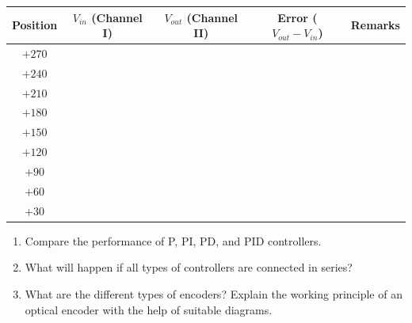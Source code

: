 \begin{procedure}
  \needspace{4cm}
  \begin{boxedtable}
    \label{tab:exp1-closed}
    {\renewcommand{\arraystretch}{1.5}%
      \centering
      \begin{tabular}{|c|c|c|c|c|}
        \hline
        Position & $V_{in}$ (Channel I) & $V_{out}$ (Channel II) & Error ($V_{out}-V_{in}$) & Remarks \\
        \hline
        $+270$   &                      &                        &                          &         \\
        \hline
        $+240$   &                      &                        &                          &         \\
        \hline
        $+210$   &                      &                        &                          &         \\
        \hline
        $+180$   &                      &                        &                          &         \\
        \hline
        $+150$   &                      &                        &                          &         \\
        \hline
        $+120$   &                      &                        &                          &         \\
        \hline
        $+90$    &                      &                        &                          &         \\
        \hline
        $+60$    &                      &                        &                          &         \\
        \hline
        $+30$    &                      &                        &                          &         \\
        \hline
      \end{tabular}
    }
  \end{boxedtable}

\end{procedure}

\begin{reportq}
  \begin{enumerate}
    \item Compare the performance of P, PI, PD, and PID controllers.
    \item What will happen if all types of controllers are connected in series?
    \item What are the different types of encoders? Explain the working principle of an optical encoder with the help of suitable diagrams.
  \end{enumerate}
\end{reportq}
